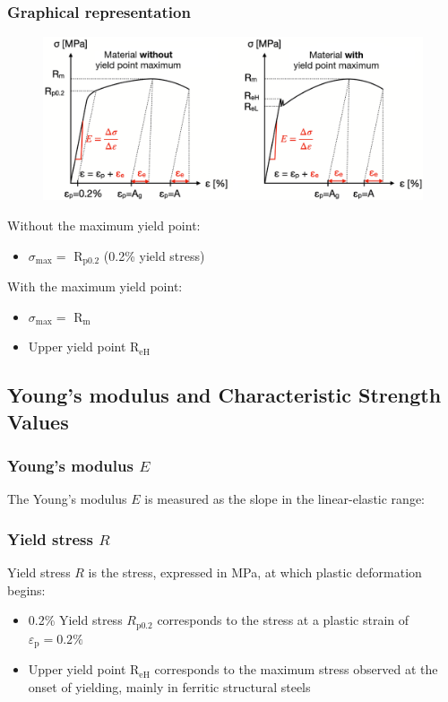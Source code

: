 \documentclass{article}
\begin{document}
\subsubsection{Graphical representation}
\begin{figure}[ht!]
  \centering
  \includegraphics[width=\textwidth]{media/stress-strain_behavior.png}
\end{figure}
\begin{minipage}[t]{.5\textwidth}
  \centering
  Without the maximum yield point:
  \begin{itemize}
    \item $\sigma_{\max} =$ R$_{\text{p0.2}}$ (0.2\% yield stress)
  \end{itemize}
\end{minipage}%
\hfill
\begin{minipage}[t]{.5\textwidth}
  \centering
  With the maximum yield point:
  \begin{itemize}
    \item $\sigma_{\max} =$ R$_{\text{m}}$
    \item Upper yield point R$_\text{eH}$
  \end{itemize}
\end{minipage}

\subsection{Young's modulus and Characteristic Strength Values}
\subsubsection{Young's modulus $E$}
The Young's modulus $E$ is measured as the slope in the linear-elastic range:

\subsubsection{Yield stress $R$}
Yield stress $R$ is the stress, expressed in MPa, at which plastic deformation begins:
\begin{itemize}
  \item 0.2\% Yield stress $R_{\text{p}0.2}$ corresponds to the stress at a plastic strain of $\varepsilon_\mathrm{p} = 0.2\%$
  \item Upper yield point R$_\text{eH}$ corresponds to the maximum stress observed at the onset of yielding, mainly in ferritic structural steels
\end{itemize} 
\end{document}
